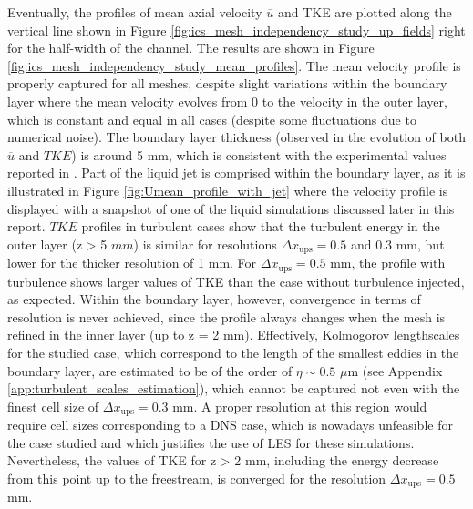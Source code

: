 Eventually, the profiles of mean axial velocity $\overline{u}$ and TKE are plotted along the vertical line shown in Figure \ref{fig:ics_mesh_independency_study_up_fields} right for the half-width of the channel. The results are shown in Figure \ref{fig:ics_mesh_independency_study_mean_profiles}. The mean velocity profile is properly captured for all meshes, despite slight variations within the boundary layer where the mean velocity evolves from 0 to the velocity in the outer layer, which is constant and equal in all cases (despite some fluctuations due to numerical noise). The boundary layer thickness (observed in the evolution of both $\overline{u}$ and $TKE$) is around 5 mm, which is consistent with the experimental values reported in . Part of the liquid jet is comprised within the boundary layer, as it is illustrated in Figure \ref{fig:Umean_profile_with_jet} where the velocity profile is displayed with a snapshot of one of the liquid simulations discussed later in this report. $TKE$ profiles in turbulent cases show that the turbulent energy in the outer layer (z > 5 $mm$) is similar for resolutions $\Delta x_\mathrm{ups} = 0.5$ and $0.3$ mm, but lower for the thicker resolution of 1 mm. For $\Delta x_\mathrm{ups} = 0.5$ mm, the profile with turbulence shows larger values of TKE than the case without turbulence injected, as expected. Within the boundary layer, however, convergence in terms of resolution is never achieved, since the profile always changes when the mesh is refined in the inner layer (up to z = 2 mm). Effectively, Kolmogorov lengthscales for the studied case, which correspond to the length of the smallest eddies in the boundary layer, are estimated to be of the order of $\eta \sim 0.5$ $\mu$m (see Appendix \ref{app:turbulent_scales_estimation}), which cannot be captured not even with the finest cell size of $\Delta x_\mathrm{ups} = 0.3$ mm. A proper resolution at this region would require cell sizes corresponding to a DNS case, which is nowadays unfeasible for the case studied and which justifies the use of LES for these simulations. Nevertheless, the values of TKE for z > 2 mm, including the energy decrease from this point up to the freestream, is converged for the resolution $\Delta x_\mathrm{ups} = 0.5$ mm. \\


